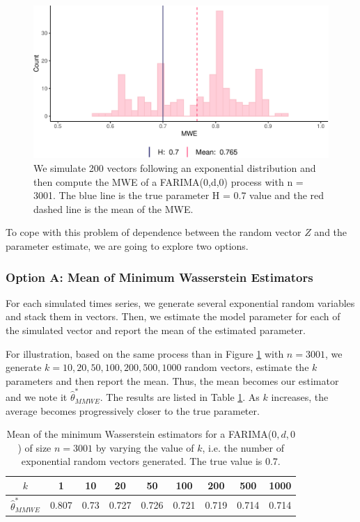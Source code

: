 \documentclass[
  11pt,
]{article}
\begin{document}
\begin{figure}[h]

{\centering \includegraphics[width=0.6\linewidth]{Master_thesis_V4_files/figure-latex/MWE_n-1} 

}

\caption{We simulate 200 vectors following an exponential distribution and then compute the MWE of a FARIMA(0,d,0) process with n = 3001. The blue line is the true parameter H = 0.7 value and the red dashed line is the mean of the MWE.}\label{fig:MWE_n}
\end{figure}

To cope with this problem of dependence between the random vector \(Z\)
and the parameter estimate, we are going to explore two options.

\hypertarget{option-a-mean-of-minimum-wasserstein-estimators}{%
\subsubsection{Option A: Mean of Minimum Wasserstein
Estimators}\label{option-a-mean-of-minimum-wasserstein-estimators}}

For each simulated times series, we generate several exponential random
variables and stack them in vectors. Then, we estimate the model
parameter for each of the simulated vector and report the mean of the
estimated parameter.

For illustration, based on the same process than in Figure
\ref{fig:MWE_n} with \(n = 3001\), we generate
\(k = 10, 20 , 50, 100 , 200, 500, 1000\) random vectors, estimate the
\(k\) parameters and then report the mean. Thus, the mean becomes our
estimator and we note it \(\hat \theta^*_{MMWE}\). The results are
listed in Table \ref{tab:MWE_k}. As \(k\) increases, the average becomes
progressively closer to the true parameter.

\begin{table}[h]
\centering
\begin{tabular}{|c|c|c|c|c|c|c|c|c|}
\hline
$k$ &  1 & 10   & 20    & 50    & 100   & 200   & 500   & 1000 \\
\hline
$\hat \theta^*_{MMWE}$ & 0.807 & 0.73 & 0.727 & 0.726 & 0.721 & 0.719 & 0.714 & 0.714 \\
\hline
\end{tabular}
\caption{Mean of the minimum Wasserstein estimators for a FARIMA($0,d,0$) of size $n = 3001$ by varying the value of $k$, i.e. the number of exponential random vectors generated. The true value is 0.7.}
\label{tab:MWE_k}
\end{table}
\end{document}
